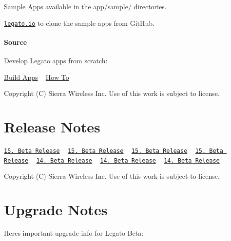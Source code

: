 \begin{DoxyItemize}
\item \hyperlink{sampleApps}{Sample Apps} available in the app/sample/ directories.
\item \href{http://www.legato.io}{\tt legato.\+io} to clone the sample apps from Git\+Hub.
\end{DoxyItemize}\hypertarget{getstarted_sample_apps_getstartedSampleApps_source}{}\paragraph{Source}\label{getstarted_sample_apps_getstartedSampleApps_source}
Develop Legato apps from scratch\+:

\hyperlink{basicApps}{Build Apps} ~\newline
 \hyperlink{howToMain}{How To}





Copyright (C) Sierra Wireless Inc. Use of this work is subject to license. \hypertarget{legatoRelNotesBeta}{}\section{Release Notes}\label{legatoRelNotesBeta}
\href{http://www.legato.io/legato-docs/15_10/legato_rel_notes_15_10.html}{\tt 15. Beta Release} ~\newline
 \href{http://www.legato.io/legato-docs/15_08/legato_rel_notes_15_08.html}{\tt 15. Beta Release} ~\newline
 \href{http://www.legato.io/legato-docs/15_05/legato_rel_notes_15_05.html}{\tt 15. Beta Release} ~\newline
 \href{http://www.legato.io/legato-docs/15_01/legato_rel_notes_15_01.html}{\tt 15. Beta Release} ~\newline
 \href{http://www.legato.io/legato-docs/14_10/legato_rel_notes_14_10.html}{\tt 14. Beta Release} ~\newline
 \href{http://www.legato.io/legato-docs/14_07/legato_rel_notes_14_07.html}{\tt 14. Beta Release} ~\newline
 \href{http://www.legato.io/legato-docs/14_04/legatoRelNotesBeta14_04.htm}{\tt 14. Beta Release} ~\newline






Copyright (C) Sierra Wireless Inc. Use of this work is subject to license. \hypertarget{legatoUpgradeBeta}{}\section{Upgrade Notes}\label{legatoUpgradeBeta}
Here\textquotesingle{}s important upgrade info for Legato Beta\+:


